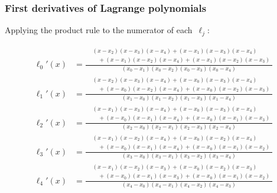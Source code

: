 \subsubsection{First derivatives of Lagrange polynomials}

Applying the product rule to the numerator of each~\(\ell_j\):

\[
\begin{aligned}
\ell_0'(x) &=
\frac{\begin{aligned}
&(x-x_2)(x-x_3)(x-x_4) + (x-x_1)(x-x_3)(x-x_4)\\
&\quad + (x-x_1)(x-x_2)(x-x_4) + (x-x_1)(x-x_2)(x-x_3)
\end{aligned}}
{(x_0-x_1)(x_0-x_2)(x_0-x_3)(x_0-x_4)}
\\[1.6ex]
%
\ell_1'(x) &=
\frac{\begin{aligned}
&(x-x_2)(x-x_3)(x-x_4) + (x-x_0)(x-x_3)(x-x_4)\\
&\quad + (x-x_0)(x-x_2)(x-x_4) + (x-x_0)(x-x_2)(x-x_3)
\end{aligned}}
{(x_1-x_0)(x_1-x_2)(x_1-x_3)(x_1-x_4)}
\\[1.6ex]
%
\ell_2'(x) &=
\frac{\begin{aligned}
&(x-x_1)(x-x_3)(x-x_4) + (x-x_0)(x-x_3)(x-x_4)\\
&\quad + (x-x_0)(x-x_1)(x-x_4) + (x-x_0)(x-x_1)(x-x_3)
\end{aligned}}
{(x_2-x_0)(x_2-x_1)(x_2-x_3)(x_2-x_4)}
\\[1.6ex]
%
\ell_3'(x) &=
\frac{\begin{aligned}
&(x-x_1)(x-x_2)(x-x_4) + (x-x_0)(x-x_2)(x-x_4)\\
&\quad + (x-x_0)(x-x_1)(x-x_4) + (x-x_0)(x-x_1)(x-x_2)
\end{aligned}}
{(x_3-x_0)(x_3-x_1)(x_3-x_2)(x_3-x_4)}
\\[1.6ex]
%
\ell_4'(x) &=
\frac{\begin{aligned}
&(x-x_1)(x-x_2)(x-x_3) + (x-x_0)(x-x_2)(x-x_3)\\
&\quad + (x-x_0)(x-x_1)(x-x_3) + (x-x_0)(x-x_1)(x-x_2)
\end{aligned}}
{(x_4-x_0)(x_4-x_1)(x_4-x_2)(x_4-x_3)}
\end{aligned}
\]



